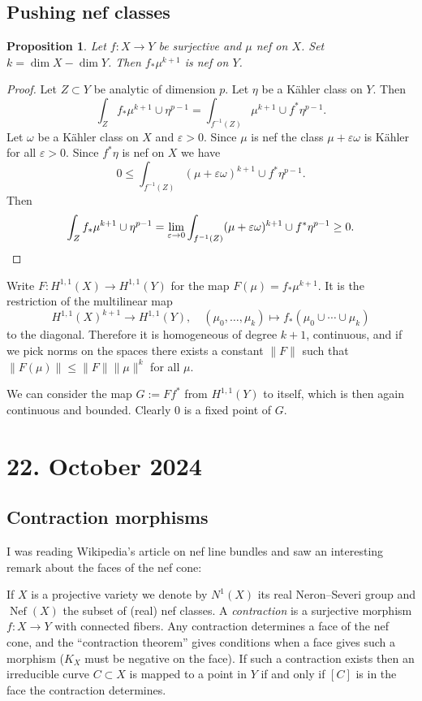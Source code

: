 \documentclass[11pt]{amsart}
\newtheorem{prop}[theo]{Proposition}
\theoremstyle{definition}
\def\eps{\varepsilon}
\begin{document}
\subsection*{Pushing nef classes}

\begin{prop}
Let $f : X \to Y$ be surjective and $\mu$ nef on $X$.
Set $k = \dim X - \dim Y$.
Then $f_* \mu^{k+1}$ is nef on $Y$.
\end{prop}

\begin{proof}
Let $Z \subset Y$ be analytic of dimension $p$.
Let $\eta$ be a K\"ahler class on $Y$.
Then
\[
\int_Z f_*\mu^{k+1} \cup \eta^{p-1}
= \int_{f^{-1}(Z)} \mu^{k+1} \cup f^*\eta^{p-1}.
\]
Let $\omega$ be a K\"ahler class on $X$ and $\eps > 0$.
Since $\mu$ is nef the class $\mu + \eps \omega$ is K\"ahler for all $\eps > 0$.
Since $f^*\eta$ is nef on $X$ we have
\[
0 \leq \int_{f^{-1}(Z)} (\mu + \eps\omega)^{k+1} \cup f^*\eta^{p-1}.
\]
Then
\[
\int_Z f_*\mu^{k+1} \cup \eta^{p-1}
= \lim_{\eps \to 0} \int_{f^{-1}(Z)} (\mu + \eps\omega)^{k+1} \cup f^*\eta^{p-1}
\geq 0.
\qedhere
\]
\end{proof}


Write $F : H^{1,1}(X) \to H^{1,1}(Y)$ for the map $F(\mu) = f_*\mu^{k+1}$.
It is the restriction of the multilinear map
\[
H^{1,1}(X)^{k+1} \to H^{1,1}(Y),
\quad
(\mu_0, \ldots, \mu_k) \mapsto f_*(\mu_0 \cup \cdots \cup \mu_k)
\]
to the diagonal.
Therefore it is homogeneous of degree $k+1$, continuous, and if we pick norms on the spaces there exists a constant $\|F\|$ such that $\|F(\mu)\| \leq \|F\| \|\mu\|^k$ for all $\mu$.

We can consider the map $G := Ff^*$ from $H^{1,1}(Y)$ to itself, which is then again continuous and bounded.
Clearly $0$ is a fixed point of $G$.



\section{22. October 2024}


\subsection*{Contraction morphisms}

I was reading Wikipedia's article on nef line bundles and saw an interesting remark about the faces of the nef cone:

If $X$ is a projective variety we denote by $N^1(X)$ its real Neron--Severi group and $\operatorname{Nef}(X)$ the subset of (real) nef classes.
A \emph{contraction} is a surjective morphism $f : X \to Y$ with connected fibers.
Any contraction determines a face of the nef cone, and the ``contraction theorem'' gives conditions when a face gives such a morphism ($K_X$ must be negative on the face).
If such a contraction exists then an irreducible curve $C \subset X$ is mapped to a point in $Y$ if and only if $[C]$ is in the face the contraction determines.
\end{document}
